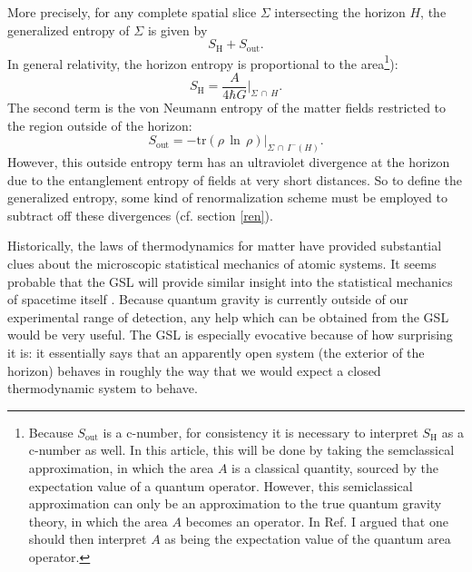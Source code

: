 \documentclass[12pt]{article}
\begin{document}
More precisely, for any complete spatial slice $\Sigma$ intersecting the horizon $H$, the generalized entropy of $\Sigma$ is given by
\begin{equation}
S_\mathrm{H} + S_\mathrm{out}.
\end{equation}
In general relativity, the horizon entropy is proportional to the area\footnote{Because $S_\mathrm{out}$ is a c-number, for consistency it is necessary to interpret $S_\mathrm{H}$ as a c-number as well.  In this article, this will be done by taking the semclassical approximation, in which the area $A$ is a classical quantity, sourced by the expectation value of a quantum operator.  However, this semiclassical approximation can only be an approximation to the true quantum gravity theory, in which the area $A$ becomes an operator.  In Ref. \cite{10proofs} I argued that one should then interpret $A$ as being the expectation value of the quantum area operator.}):
\begin{equation}
S_\mathrm{H} = \frac{A}{4\hbar G}|_{\Sigma\,\cap\,H}.
\end{equation}
The second term is the von Neumann entropy of the matter fields restricted to the region outside of the horizon:
\begin{equation}
S_\mathrm{out} = -\mathrm{tr}(\rho\,\ln\,\rho)|_{\Sigma\,\cap\,I^{-}(H)}.
\end{equation}
However, this outside entropy term has an ultraviolet divergence at the horizon due to the entanglement entropy of fields at very short distances.   So to define the generalized entropy, some kind of renormalization scheme must be employed to subtract off these divergences (cf. section \ref{ren}).

Historically, the laws of thermodynamics for matter have provided substantial clues about the microscopic statistical mechanics of atomic systems.  It seems probable that the GSL will provide similar insight into the statistical mechanics of spacetime itself \cite{sorkin83}.  Because quantum gravity is currently outside of our experimental range of detection, any help which can be obtained from the GSL would be very useful.  The GSL is especially evocative because of how surprising it is: it essentially says that an apparently open system (the exterior of the horizon) behaves in roughly the way that we would expect a closed thermodynamic system to behave.
\end{document}
